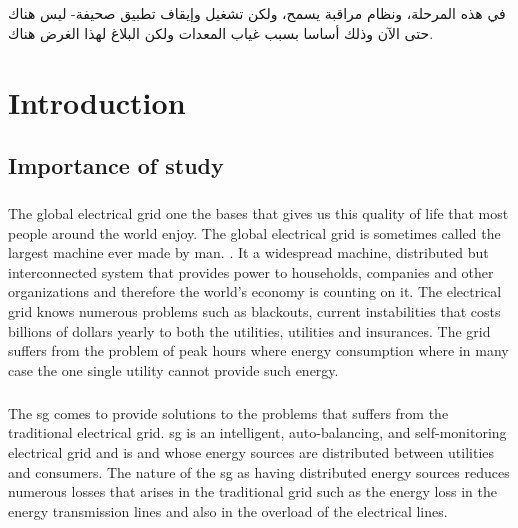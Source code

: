 \documentclass[oneside,12pt,a4paper,final]{book}
\begin{document}
\paragraph{}
\begin{arabtex}

في هذه المرحلة، ونظام مراقبة يسمح، ولكن تشغيل وإيقاف تطبيق صحيفة-
 ليس هناك حتى الآن وذلك أساسا بسبب غياب المعدات ولكن البلاغ لهذا الغرض هناك.
\end{arabtex}

\singlespacing

\tableofcontents
\listoffigures
\listoftables

\mainmatter
\doublespacing
\chapter{Introduction}

\section{Importance of study}
\paragraph{}
The global electrical grid one the bases that gives us this quality of life that most people around the world enjoy. The global electrical grid is sometimes called the largest machine ever made by man. \cite{ref1}. It a widespread machine, distributed but interconnected system that provides power to households, companies and other organizations and therefore the world's economy is counting on it. The electrical grid knows numerous problems such as blackouts, current instabilities that costs billions of dollars yearly to both the utilities, utilities and insurances. The grid suffers from the problem of peak hours where energy consumption where in many case the one single utility cannot provide such energy.
\paragraph{}
The \gls{sg} comes to provide solutions to the problems that suffers from the traditional electrical grid. \gls{sg} is an intelligent, auto-balancing, and self-monitoring electrical grid \cite{ref2} and is and whose energy sources are distributed between utilities and consumers. The nature of the \gls{sg} as having distributed energy sources reduces numerous losses that arises in the traditional grid such as the energy loss in the energy transmission lines and also in the overload of the electrical lines.
\end{document}
